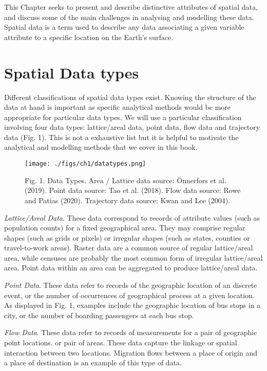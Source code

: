 \documentclass[
  letterpaper,
  krantz2]{style/krantz}
\begin{document}
This Chapter seeks to present and describe distinctive attributes of
spatial data, and discuss some of the main challenges in analysing and
modelling these data. Spatial data is a term used to describe any data
associating a given variable attribute to a specific location on the
Earth's surface.

\hypertarget{spatial-data-types}{%
\section{Spatial Data types}\label{spatial-data-types}}

Different classifications of spatial data types exist. Knowing the
structure of the data at hand is important as specific analytical
methods would be more appropriate for particular data types. We will use
a particular classification involving four data types: lattice/areal
data, point data, flow data and trajectory data (Fig. 1). This is not a
exhaustive list but it is helpful to motivate the analytical and
modelling methods that we cover in this book.

\begin{figure}

{\centering \texttt{[image: ./figs/ch1/datatypes.png]}

}

\caption{Fig. 1. Data Types. Area / Lattice data source: Önnerfors et
al. (2019). Point data source: Tao et al. (2018). Flow data source: Rowe
and Patias (2020). Trajectory data source: Kwan and Lee (2004).}

\end{figure}

\emph{Lattice/Areal Data}. These data correspond to records of attribute
values (such as population counts) for a fixed geographical area. They
may comprise regular shapes (such as grids or pixels) or irregular
shapes (such as states, counties or travel-to-work areas). Raster data
are a common source of regular lattice/areal area, while censuses are
probably the most common form of irregular lattice/areal area. Point
data within an area can be aggregated to produce lattice/areal data.

\emph{Point Data}. These data refer to records of the geographic
location of an discrete event, or the number of occurrences of
geographical process at a given location. As displayed in Fig. 1,
examples include the geographic location of bus stops in a city, or the
number of boarding passengers at each bus stop.

\emph{Flow Data}. These data refer to records of measurements for a pair
of geographic point locations. or pair of areas. These data capture the
linkage or spatial interaction between two locations. Migration flows
between a place of origin and a place of destination is an example of
this type of data.
\end{document}
